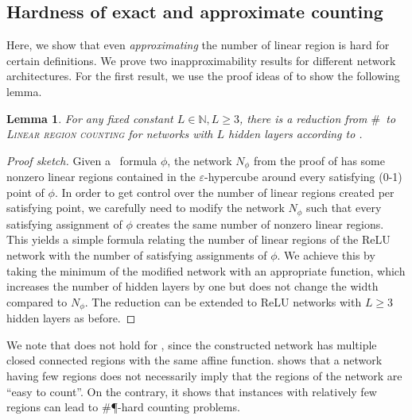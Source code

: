 \documentclass{article}
\newtheorem{lemma}[theorem]{Lemma}
\begin{document}
\subsection{Hardness of exact and approximate counting}
\label{sec:hardness of approximation}
Here, we show that even \emph{approximating} the number of linear region is hard for certain definitions.
We prove two inapproximability results for different network architectures.
For the first result, we use the proof ideas of  to show the following lemma.
\begin{lemma}
\label{thm:sharp_sat_reduction}
For any fixed constant $L\in \mathbb{N}, L\geq 3$, there is a reduction from $\#$\SAT\ to \textsc{Linear region counting} for networks with $L$ hidden layers according to .
\end{lemma}
\begin{proof}[Proof sketch]
Given a \SAT\ formula $\phi$, the network $N_\phi$ from the proof of  has some nonzero linear regions contained in the $\varepsilon$-hypercube around every satisfying (0-1) point of $\phi$.
In order to get control over the number of linear regions created per satisfying point, we carefully need to modify the network $N_\phi$ such that every satisfying assignment of $\phi$ creates the same number of nonzero linear regions. This yields a simple formula relating the number of linear regions of the ReLU network with the number of satisfying assignments of $\phi$.
We achieve this by taking the minimum of the modified network with an appropriate function, which increases the number of hidden layers by one but does not change the width compared to $N_\phi$.
The reduction can be extended to ReLU networks with $L\geq 3$ hidden layers as before.
\end{proof}
We note that  does not hold for , since the constructed network has multiple closed connected regions with the same affine function.
 shows that a network having few regions does not necessarily imply that the regions of the network are ``easy to count''.
On the contrary, it shows that instances with relatively few regions can lead to \#\P-hard counting problems.
\end{document}
